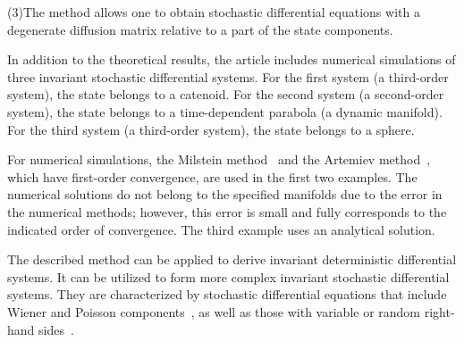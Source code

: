\documentclass[10pt,reqno]{amsart}
\theoremstyle{plain}
\theoremstyle{remark}
\begin{document}
(3)\;The method allows one to obtain stochastic differential equations with a degenerate diffusion matrix relative to a part of the state components.

In addition to the theoretical results, the article includes numerical simulations of three invariant stochastic differential systems. For the first system (a third-order system), the state belongs to a catenoid. For the second system (a second-order system), the state belongs to a time-dependent parabola (a dynamic manifold). For the third system (a third-order system), the state belongs to a sphere.

For numerical simulations, the Milstein method~\cite{MilTre_04} and the Artemiev method~\cite{ArtAve_97}, which have first-order convergence, are used in the first two examples. The numerical solutions do not belong to the specified manifolds due to the error in the numerical methods; however, this error is small and fully corresponds to the indicated order of convergence. The third example uses an analytical solution.

The described method can be applied to derive invariant deterministic differential systems. It can be utilized to form more complex invariant stochastic differential systems. They are characterized by stochastic differential equations that include Wiener and Poisson components~\cite{Kar_15, Kar_21}, as well as those with variable or random right-hand sides~\cite{AveRyb_STAB18}.
\end{document}
